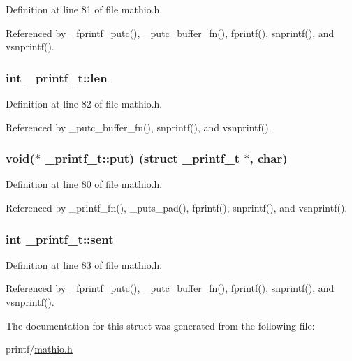 Definition at line 81 of file mathio.\+h.



Referenced by \+\_\+fprintf\+\_\+putc(), \+\_\+putc\+\_\+buffer\+\_\+fn(), fprintf(), snprintf(), and vsnprintf().

\subsubsection[{\texorpdfstring{len}{len}}]{\setlength{\rightskip}{0pt plus 5cm}int \+\_\+printf\+\_\+t\+::len}\hypertarget{struct__printf__t_a5139902cde74159b79e6418a34712bee}{}\label{struct__printf__t_a5139902cde74159b79e6418a34712bee}


Definition at line 82 of file mathio.\+h.



Referenced by \+\_\+putc\+\_\+buffer\+\_\+fn(), snprintf(), and vsnprintf().

\subsubsection[{\texorpdfstring{put}{put}}]{\setlength{\rightskip}{0pt plus 5cm}void($\ast$ \+\_\+printf\+\_\+t\+::put) (struct {\bf \+\_\+printf\+\_\+t} $\ast$, char)}\hypertarget{struct__printf__t_a3ef8eb0143b93d4446b04c6ce9313be7}{}\label{struct__printf__t_a3ef8eb0143b93d4446b04c6ce9313be7}


Definition at line 80 of file mathio.\+h.



Referenced by \+\_\+printf\+\_\+fn(), \+\_\+puts\+\_\+pad(), fprintf(), snprintf(), and vsnprintf().

\subsubsection[{\texorpdfstring{sent}{sent}}]{\setlength{\rightskip}{0pt plus 5cm}int \+\_\+printf\+\_\+t\+::sent}\hypertarget{struct__printf__t_a872716fd701166cd57bd3fffb7b77706}{}\label{struct__printf__t_a872716fd701166cd57bd3fffb7b77706}


Definition at line 83 of file mathio.\+h.



Referenced by \+\_\+fprintf\+\_\+putc(), \+\_\+putc\+\_\+buffer\+\_\+fn(), fprintf(), snprintf(), and vsnprintf().



The documentation for this struct was generated from the following file\+:\begin{DoxyCompactItemize}
\item 
printf/\hyperlink{mathio_8h}{mathio.\+h}\end{DoxyCompactItemize}

